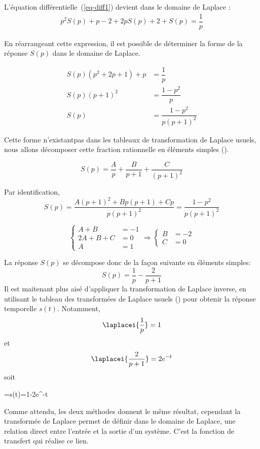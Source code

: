 L'équation différentielle~(\ref{eq-diff1}) devient dans le domaine de Laplace :
\begin{align*}
p^2S(p)+p-2+2pS(p)+2+S(p)=\dfrac{1}{p} 
\end{align*}

En réarrangeant cette expression, il est possible de déterminer la forme de la réponse 
$S(p)$ dans le domaine de Laplace.

\begin{align*}
    S(p)\left(p^2+2p+1\right)+p&=\dfrac{1}{p} \\
    S(p)\left(p+1\right)^2 &= \dfrac{1-p^2}{p}\\
    S(p)&= \dfrac{1-p^2}{p\left(p+1\right)^2}
\end{align*}

Cette forme \og n'existant\fg pas dans les tableaux de transformation de Laplace usuels, nous allons décomposer cette
fraction rationnelle en éléments simples ().

$$
S(p)=\dfrac{A}{p}+\dfrac{B}{p+1}+\dfrac{C}{(p+1)^2}
$$

Par identification, 
$$
S(p)=\dfrac{A(p+1)^2+Bp(p+1)+Cp}{p(p+1)^2}=\dfrac{1-p^2}{p\left(p+1\right)^2}
$$

$$
\begin{cases}
    A+B&=-1 \\
    2A+B+C&=0 \\
    A&=1   
\end{cases}\Rightarrow
\begin{cases}
    B&=-2\\
    C&=0
\end{cases}
$$

La réponse $S(p)$ se décompose donc de la façon suivante en éléments simples:
$$
S(p)=\dfrac{1}{p}-\dfrac{2}{p+1}
$$
Il est maitenant plus aisé d'appliquer la transformation de Laplace inverse, 
en utilisant le tableau des transformées de Laplace usuels () 
pour obtenir la réponse temporelle $s(t)$. Notamment,
$$
\laplacei{\dfrac{1}{p}}=1
$$
et
$$
\laplacei{\dfrac{2}{p+1}}=2e^{-t}
$$
soit 
\begin{bequation}
    =s(t)=1-2e^{-t}
\end{bequation}

Comme attendu, les deux méthodes donnent le même résultat, cependant la transformée de Laplace permet de définir dans 
le domaine de Laplace, une relation direct entre l'entrée et la sortie d'un système. C'est la fonction de transfert 
qui réalise ce lien.

